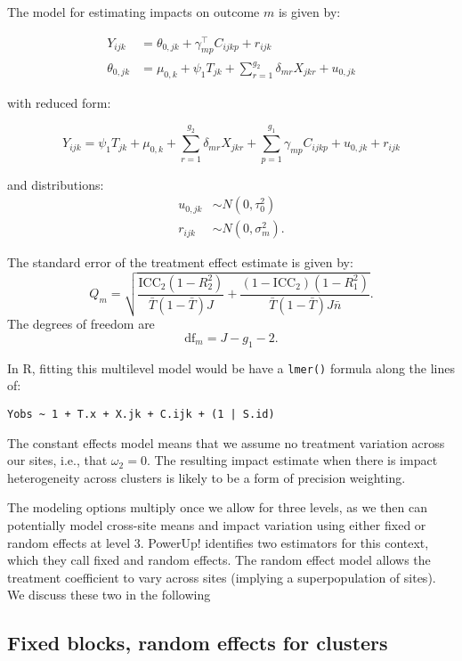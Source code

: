 \documentclass[]{article}
\begin{document}
The model for estimating impacts on outcome $m$ is given by:

\[
\begin{aligned}
Y_{ijk} &=  \theta_{0,jk} + \gamma_{mp}^{\top} C_{ijkp} + r_{ijk}\\
\theta_{0,jk} &= \mu_{0,k} + \psi_{1} T_{jk} + \sum_{r=1}^{g_{2}} \delta_{mr} X_{jkr} + u_{0,jk}
\end{aligned}
\]

with reduced form:

\[
Y_{ijk} = \psi_{1} T_{jk} + \mu_{0,k} + \sum_{r=1}^{g_{2}} \delta_{mr} X_{jkr} + \sum_{p=1}^{g_{1}} \gamma_{mp} C_{ijkp} + u_{0,jk} + r_{ijk}
\]

and distributions: \[
\begin{aligned}
u_{0,jk} &\sim N\left(0, \tau^2_{0}\right)\\
r_{ijk} &\sim N\left(0, \sigma^2_m\right).
\end{aligned}
\]

The standard error of the treatment effect estimate is given by: \[
Q_m = \sqrt{\frac{\text{ICC}_{2}(1 - R^2_{2})}{\bar{T}(1 - \bar{T}) J} + \frac{(1-\text{ICC}_{2})(1-R^2_{1})}{\bar{T}(1 - \bar{T}) J \bar{n}}}.
\] The degrees of freedom are \[
\text{df}_m = J - g_{1} - 2.
\]

In R, fitting this multilevel model would be have a \texttt{lmer()}
formula along the lines of:

\begin{verbatim}
Yobs ~ 1 + T.x + X.jk + C.ijk + (1 | S.id)
\end{verbatim}

The constant effects model means that we assume no treatment variation
across our sites, i.e., that $\omega_{2} = 0$. The resulting impact
estimate when there is impact heterogeneity across clusters is likely to
be a form of precision weighting.

The modeling options multiply once we allow for three levels, as we then
can potentially model cross-site means and impact variation using either
fixed or random effects at level 3. PowerUp! identifies two estimators
for this context, which they call fixed and random effects. The random
effect model allows the treatment coefficient to vary across sites
(implying a superpopulation of sites). We discuss these two in the
following

\hypertarget{fixed-blocks-random-effects-for-clusters}{%
\subsection{Fixed blocks, random effects for
clusters}\label{fixed-blocks-random-effects-for-clusters}}
\end{document}
